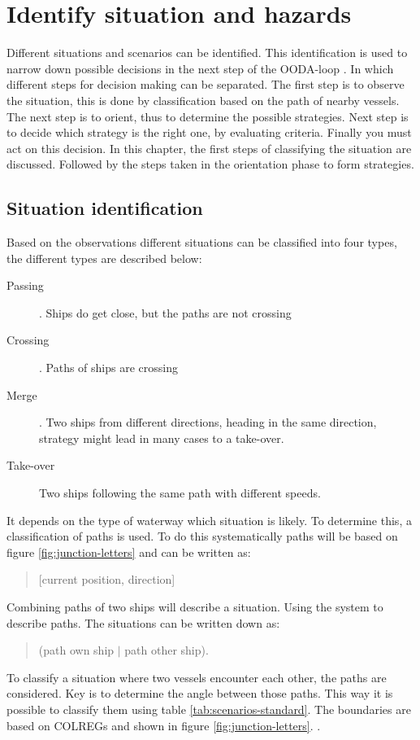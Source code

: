 \chapter{Identify situation and hazards}
Different situations and scenarios can be identified. This identification is used to narrow down possible decisions in the next step of the OODA-loop . In which different steps for decision making can be separated. The first step is to observe the situation, this is done by classification based on the path of nearby vessels. The next step is to orient, thus to determine the possible strategies. Next step is to decide which strategy is the right one, by evaluating criteria. Finally you must act on this decision. In this chapter, the first steps of classifying the situation are discussed. Followed by the steps taken in the orientation phase to form strategies.

\section{Situation identification}
\label{sec:situation-identification}
Based on the observations different situations can be classified into four types, the different types are described below: 
\begin{description}
	\item [Passing]. Ships do get close, but the paths are not crossing
	\item [Crossing]. Paths of ships are crossing
	\item [Merge]. Two ships from different directions, heading in the same direction, strategy might lead in many cases to a take-over.
	\item [Take-over] Two ships following the same path with different speeds.
\end{description}
It depends on the type of waterway which situation is likely. To determine this, a classification of paths is used. To do this systematically paths will be based on figure \ref{fig:junction-letters} and can be written as: 
\begin{quote}
	[current position, direction]
\end{quote}
Combining paths of two ships will describe a situation. Using the system to describe paths. The situations can be written down as:
\begin{quote}
	(path own ship $|$ path other ship).
\end{quote}

To classify a situation where two vessels encounter each other, the paths are considered. Key is to determine the angle between those paths. This way it is possible to classify them using table \ref{tab:scenarios-standard}.
The boundaries are based on \ac{COLREGs} and shown in figure \ref{fig:junction-letters}. .

